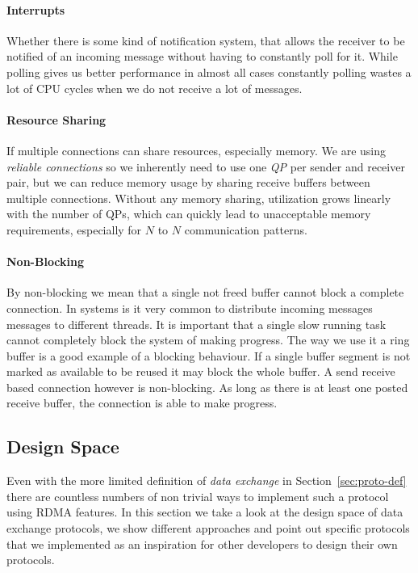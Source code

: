 \paragraph{Interrupts} Whether there is some kind of notification system, that allows the receiver to be notified 
of an incoming message without having to constantly poll for it. While polling gives us better performance in almost all cases
constantly polling wastes a lot of CPU cycles when we do not receive a lot of messages.

\paragraph{Resource Sharing} If multiple connections can share resources, especially memory. We are using \emph{reliable connections}
so we inherently need to use one \emph{QP} per sender and receiver pair, but we can reduce memory usage by sharing receive 
buffers between multiple connections. Without any memory sharing, utilization grows linearly with the number of QPs, which 
can quickly lead to unacceptable memory requirements, especially for $N$ to $N$ communication patterns.

\paragraph{Non-Blocking} By non-blocking we mean that a single not freed buffer cannot block a complete connection. In systems
is it very common to distribute incoming messages messages to different threads. It is important that a single slow running 
task cannot completely block the system of making progress. The way we use it a ring buffer is a good example of a blocking
behaviour. If a single buffer segment is not marked as available to be reused it may block the whole buffer. A send receive 
based connection however is non-blocking. As long as there is at least one posted receive buffer, the connection is able to
make progress.




\subsection{Design Space} \label{sec:proto-ds}


Even with the more limited definition of \emph{data exchange} in Section~\ref{sec:proto-def} there are countless numbers
of non trivial ways to implement such a protocol using RDMA features. In this section we take a look at the design 
space of data exchange protocols, we show different approaches and point out specific protocols that we implemented
as an inspiration for other developers to design their own protocols.


